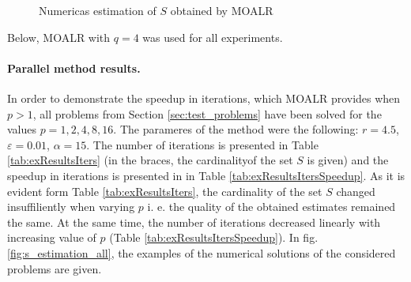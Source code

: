 \documentclass{llncs}
\begin{document}
\begin{figure}[ht]
    \centering
    \caption{Numericas estimation of \(S\) obtained by MOALR}
    \label{fig:fonseca_slater}
\end{figure}

Below, MOALR with \(q=4\) was used for all experiments.

\paragraph{Parallel method results.} In order to demonstrate the speedup in iterations, which
MOALR provides when \(p > 1\), all problems from Section \ref{sec:test_problems} have been
solved for the values \(p=1,2,4,8,16\). The parameres of the method were the following:
\(r=4.5\), \(\varepsilon=0.01\), \(\alpha=15\). The number of iterations is presented in Table \ref{tab:exResultsIters}
(in the braces, the cardinalityof the set \(S\) is given) and the speedup in iterations is presented
in in Table \ref{tab:exResultsItersSpeedup}. As it is evident form Table
\ref{tab:exResultsIters}, the cardinality of the set \(S\) changed insuffiliently when varying \(p\)
i. e. the quality of the obtained estimates remained the same. At the same time, the number of
iterations decreased linearly with increasing value of \(p\) (Table
\ref{tab:exResultsItersSpeedup}). In fig. \ref{fig:s_estimation_all}, the examples of the
numerical solutions of the considered problems are given.
\end{document}
